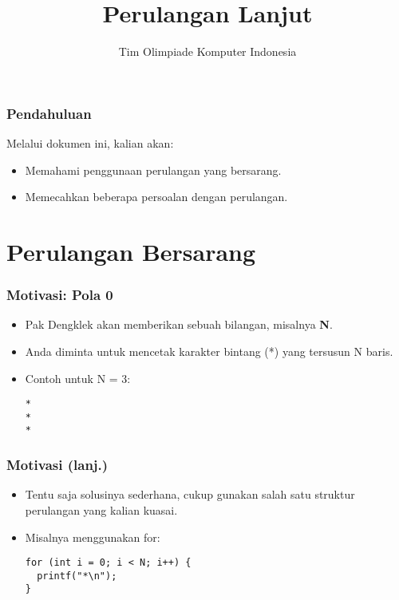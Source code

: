 

\title{Perulangan Lanjut}
\author{Tim Olimpiade Komputer Indonesia}
\date{}



\begin{frame}
\titlepage
\end{frame}

\begin{frame}
\frametitle{Pendahuluan}
Melalui dokumen ini, kalian akan:
\begin{itemize}
  \item Memahami penggunaan perulangan yang bersarang.
  \item Memecahkan beberapa persoalan dengan perulangan.
\end{itemize}
\end{frame}

\section{Perulangan Bersarang}
\frame{\sectionpage}

\begin{frame}[fragile]
\frametitle{Motivasi: Pola 0}
\begin{itemize}
  \item Pak Dengklek akan memberikan sebuah bilangan, misalnya \textbf{N}.
  \item Anda diminta untuk mencetak karakter bintang (*) yang tersusun N baris.
  \item Contoh untuk N = 3:
\begin{lstlisting}
*
*
*
\end{lstlisting}
\end{itemize}
\end{frame}

\begin{frame}[fragile]
\frametitle{Motivasi (lanj.)}
\begin{itemize}
  \item Tentu saja solusinya sederhana, cukup gunakan salah satu struktur perulangan yang kalian kuasai.
  \item Misalnya menggunakan for:
\begin{lstlisting}
for (int i = 0; i < N; i++) {
  printf("*\n");
}
\end{lstlisting}
\end{itemize}
\end{frame}

